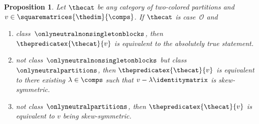 \documentclass[pdftex]{sigma}
\numberwithin{equation}{section}
\newtheorem{Proposition}[Theorem]{Proposition}
{ \theoremstyle{definition}
\newtheorem{Definition}[Theorem]{Definition}
\newtheorem{Note}[Theorem]{Note}
\newtheorem{Example}[Theorem]{Example}
\newtheorem{Remark}[Theorem]{Remark}
\newtheorem{Notation}[Theorem]{Notation}
\newtheorem{Assumptions}[Theorem]{Assumptions}
}
\begin{document}
{
  \newcommand{\somerel}{r}
  \newcommand{\indj}{j}
  \newcommand{\indi}{i}
  \newcommand{\inda}{i}
   \newcommand{\indb}{j}
  \newcommand{\infree}{g}
  \newcommand{\outfree}{j}
  \newcommand{\infreex}[1]{g_{#1}}
  \newcommand{\outfreex}[1]{j_{#1}}
  \newcommand{\thetuple}{x^\themat}
  \newcommand{\thetuplex}[1]{x_{#1}^\themat}
    \newcommand{\incol}{\Yc{c}}
    \newcommand{\inlen}{k}
    \newcommand{\outcol}{\Yc{d}}
    \newcommand{\outlen}{\ell}
    \newcommand{\thepartition}{p}
    \newcommand{\themat}{v}
    \newcommand{\thematx}[2]{v_{#1,#2}}
    \newcommand{\thesum}{\lambda}
  \newcommand{\someblock}{\Yb{B}}
  \newcommand{\specialblock}{\Yb{Y}}
  \newcommand{\blocklabeling}{h}
  \newcommand{\altblocklabeling}{h'}
  \newcommand{\inds}{s}
  \newcommand{\partparamfour}{t}
  \newcommand{\firstsum}{\lambda_1}
  \newcommand{\secondsum}{\lambda_2}
  \newcommand{\firstincol}{\Yc{c}}
    \newcommand{\firstoutcol}{\Yc{d}}
    \newcommand{\firstpartition}{p}
  \newcommand{\secondincol}{\Yc{a}}
    \newcommand{\secondoutcol}{\Yc{b}}
    \newcommand{\secondpartition}{q}
    \newcommand{\anyblock}{\Yb{A}}
    \newcommand{\thetwoblock}{\Yb{Y}}
    \newcommand{\countblock}{\Yb{A}}
    \newcommand{\thethreeblock}{\Yb{Z}}

\begin{Proposition}  \label{proposition:final-case-o}
  Let $\thecat$ be any category of two-colored partitions and $\themat\in\squarematrices{\thedim}{\comps}$.
  If $\thecat$ is case~$\mathcal{O}$ and
    \begin{enumerate}[label=$(\roman*)$]
    \item\label{proposition:final-case-o-1}  class~$\onlyneutralnonsingletonblocks$, then $\thepredicatex{\thecat}{\themat}$ is equivalent to the absolutely true statement.
    \item\label{proposition:final-case-o-2}  not class~$\onlyneutralnonsingletonblocks$ but  class~$\onlyneutralpartitions$, then $\thepredicatex{\thecat}{\themat}$ is equivalent to there existing $\thesum\in\comps$ such that $\themat-\thesum\identitymatrix$ is skew-symmetric.
    \item\label{proposition:final-case-o-3}  not class~$\onlyneutralpartitions$, then $\thepredicatex{\thecat}{\themat}$ is equivalent to $\themat$ being skew-symmetric.
  \end{enumerate}
\end{Proposition}

}
\end{document}
